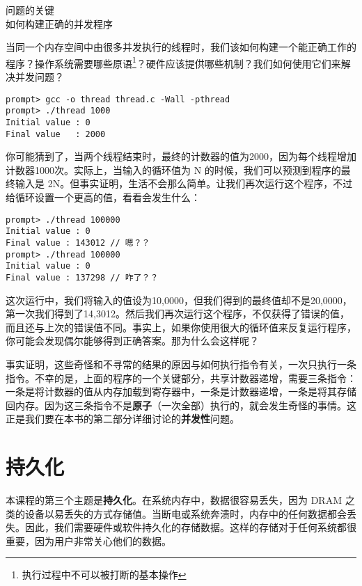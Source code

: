 \begin{tcolorbox}[colframe=grey,colback= grey,arc=0pt,left=6pt,right=6pt,top=6pt,bottom=6pt,boxsep=0pt]
\begin{center}
问题的关键\\
如何构建正确的并发程序
\end{center}
当同一个内存空间中由很多并发执行的线程时，我们该如何构建一个能正确工作的程序？操作系统需要哪些原语\footnote{执行过程中不可以被打断的基本操作}？硬件应该提供哪些机制？我们如何使用它们来解决并发问题？
\end{tcolorbox}

\begin{verbatim}
prompt> gcc -o thread thread.c -Wall -pthread 
prompt> ./thread 1000 
Initial value : 0 
Final value   : 2000
\end{verbatim}

你可能猜到了，当两个线程结束时，最终的计数器的值为2000，因为每个线程增加计数器1000次。实际上，当输入的循环值为 N 的时候，我们可以预测到程序的最终输入是 2N。但事实证明，生活不会那么简单。让我们再次运行这个程序，不过给循环设置一个更高的值，看看会发生什么：

\begin{verbatim}
prompt> ./thread 100000 
Initial value : 0 
Final value : 143012 // 嗯？？ 
prompt> ./thread 100000 
Initial value : 0 
Final value : 137298 // 咋了？？
\end{verbatim}

这次运行中，我们将输入的值设为10,0000，但我们得到的最终值却不是20,0000，第一次我们得到了14,3012。然后我们再次运行这个程序，不仅获得了错误的值，而且还与上次的错误值不同。事实上，如果你使用很大的循环值来反复运行程序，你可能会发现偶尔能够得到正确答案。那为什么会这样呢？

事实证明，这些奇怪和不寻常的结果的原因与如何执行指令有关，一次只执行一条指令。不幸的是，上面的程序的一个关键部分，共享计数器递增，需要三条指令：一条是将计数器的值从内存加载到寄存器中，一条是计数器递增，一条是将其存储回内存。因为这三条指令不是\textbf{原子}（一次全部）执行的，就会发生奇怪的事情。这正是我们要在本书的第二部分详细讨论的\textbf{并发性}问题。

\section{持久化}
本课程的第三个主题是\textbf{持久化}。在系统内存中，数据很容易丢失，因为 DRAM 之类的设备以易丢失的方式存储值。当断电或系统奔溃时，内存中的任何数据都会丢失。因此，我们需要硬件或软件持久化的存储数据。这样的存储对于任何系统都很重要，因为用户非常关心他们的数据。

